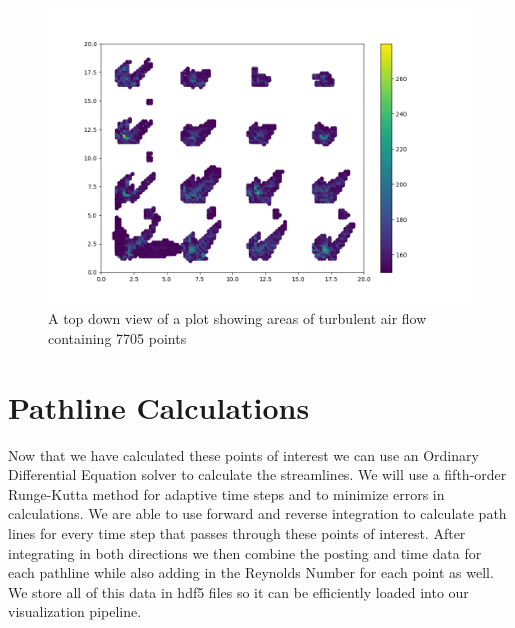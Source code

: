 \begin{figure}
\centering
\includegraphics[scale=.35]{Figures/Turb2D_4_11.png}
\decoRule
\caption[Turbulent Air Flow Scatter Plot]{A top down view of a plot showing areas of turbulent air flow containing 7705 points}
\label{fig:MTurbulentflow}
\end{figure}
\section{Pathline Calculations}


Now that we have calculated these points of interest we can use an Ordinary Differential Equation solver to calculate the streamlines. We will use a fifth-order Runge-Kutta method for adaptive time steps and to minimize errors in calculations. We are able to use forward and reverse integration to calculate path lines for every time step that passes through these points of interest. After integrating in both directions we then combine the posting and time data for each pathline while also adding in the Reynolds Number for each point as well. We store all of this data in hdf5 files so it can be efficiently loaded into our visualization pipeline. 


